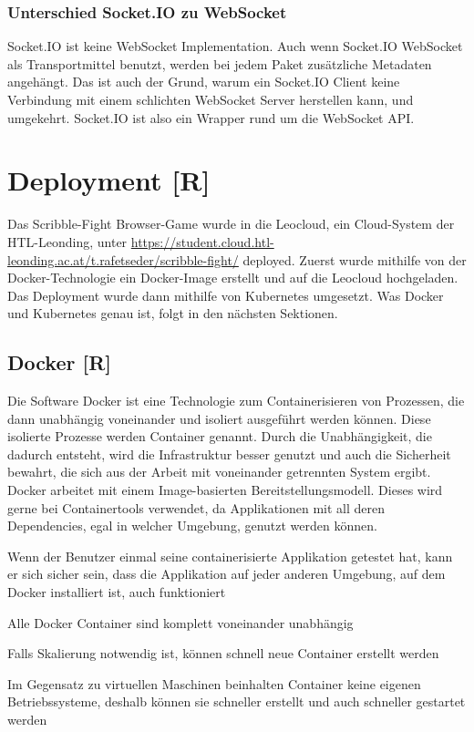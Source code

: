 \subsubsection{Unterschied Socket.IO zu WebSocket}
Socket.IO ist keine WebSocket Implementation. Auch wenn Socket.IO WebSocket als Transportmittel benutzt, werden bei jedem Paket zusätzliche Metadaten angehängt. Das ist auch der Grund, warum
ein Socket.IO Client keine Verbindung mit einem schlichten WebSocket Server herstellen kann, und umgekehrt.
Socket.IO ist also ein Wrapper rund um die WebSocket API.

\section{Deployment [R]}
Das Scribble-Fight Browser-Game wurde in die Leocloud, ein Cloud-System der HTL-Leonding, unter \url{https://student.cloud.htl-leonding.ac.at/t.rafetseder/scribble-fight/} deployed.
Zuerst wurde mithilfe von der Docker-Technologie ein Docker-Image erstellt und auf die Leocloud hochgeladen. Das Deployment wurde dann mithilfe von Kubernetes umgesetzt.
Was Docker und Kubernetes genau ist, folgt in den nächsten Sektionen.
\subsection{Docker [R]} \label{tech:docker}
Die Software Docker ist eine Technologie zum Containerisieren von Prozessen, die dann unabhängig voneinander und isoliert ausgeführt werden können. Diese isolierte Prozesse werden Container genannt.
Durch die Unabhängigkeit, die dadurch entsteht, wird die Infrastruktur besser genutzt und auch die Sicherheit bewahrt, die sich aus der Arbeit mit voneinander getrennten System ergibt.
Docker arbeitet mit einem Image-basierten Bereitstellungsmodell. Dieses wird gerne bei Containertools verwendet, da Applikationen mit all deren Dependencies, egal in welcher Umgebung, genutzt werden können.
\begin{compactitem}
    \item Wenn der Benutzer einmal seine containerisierte Applikation getestet hat, kann er sich sicher sein, dass die Applikation auf jeder anderen Umgebung, auf dem Docker installiert ist, auch funktioniert
    \item Alle Docker Container sind komplett voneinander unabhängig
    \item Falls Skalierung notwendig ist, können schnell neue Container erstellt werden
    \item Im Gegensatz zu virtuellen Maschinen beinhalten Container keine eigenen Betriebssysteme, deshalb können sie schneller erstellt und auch schneller gestartet werden
\end{compactitem}

